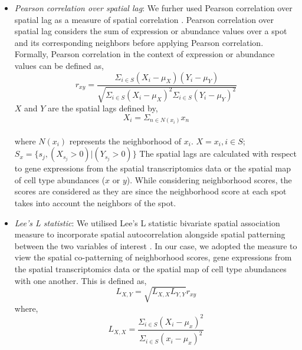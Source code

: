 \begin{itemize}
    $\mu_{w_{ct_x}}$ is the average cell type abundance for a specific cell type $ct_x$\\
    $S_x = \{s_j, (NS_{lt}(s_j) > 0) | (w_{s_j,ct_x} > 0)\}$ where $x$ is either a ligand $l$ or target $t$.\\
    \item \emph{Pearson correlation over spatial lag}: We furher used Pearson correlation over spatial lag as a measure of spatial correlation \citep{Lee2001}. Pearson correlation over spatial lag considers the sum of expression or abundance values over a spot and its corresponding neighbors before applying Pearson correlation. Formally, Pearson correlation in the context of expression or abundance values can be defined as,\\
    $$r_{xy} = \frac{\Sigma_{i \in S} (X_i - \mu_{X})(Y_i - \mu_{Y})}{\sqrt{\Sigma_{i \in S} (X_i - \mu_{X})^2 \Sigma_{i \in S} (Y_i - \mu_{Y})^2}}$$
    $X$ and $Y$ are the spatial lags defined by,\\
    $$X_i = \Sigma_{n \in N(x_i)} x_n$$\\
    where $N(x_i)$ represents the neighborhood of $x_i$.
    $X = {x_i}, i \in S$; $S_x = \{s_j, (X_{s_j} > 0) | (Y_{s_j} > 0)\}$
    The spatial lags are calculated with respect to gene expressions from the spatial transcriptomics data or the spatial map of cell type abundances ($x$ or $y$). While considering neighborhood scores, the scores are considered as they are since the neighborhood score at each spot takes into account the neighbors of the spot.
    \item \emph{Lee's L statistic}: We utilised Lee's L statistic bivariate spatial association measure to incorporate spatial autocorrelation alongside spatial patterning between the two variables of interest \citep{Lee2001}. In our case, we adopted the measure to view the spatial co-patterning of neighborhood scores, gene expressions from the spatial transcriptomics data or the spatial map of cell type abundances with one another. This is defined as,
    $$L_{X,Y} = \sqrt{L_{X,X} L_{Y,Y}} r_{xy}$$
    where,\\
    $$L_{X,X} = \frac{\Sigma_{i \in S} (X_i - \mu_x)^2}{\Sigma_{i \in S} (x_i - \mu_x)^2}$$
\end{itemize}